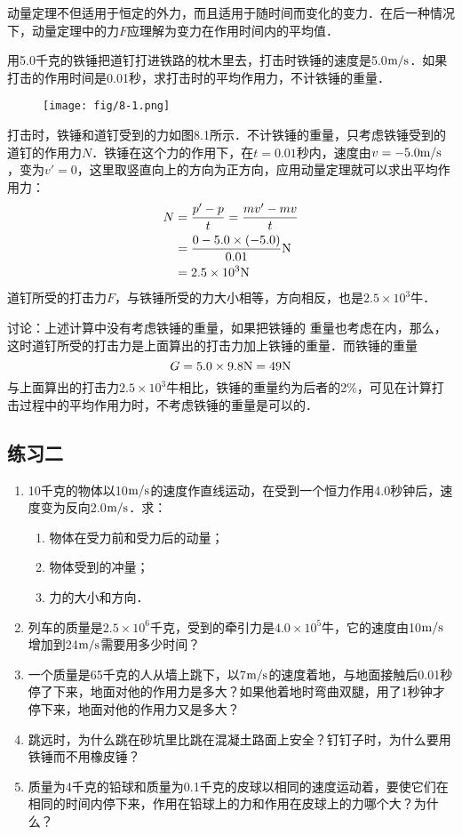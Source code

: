 动量定理不但适用于恒定的外力，而且适用于随时间而变化的变力．在后一种情况下，动量定理中的力$F$应理解为变力在作用时间内的平均值．


\begin{example}
    用5.0千克的铁锤把道钉打进铁路的枕木里去，打击时铁锤的速度是5.0$\text{m}/\text{s}$．如果打击的作用时间是0.01秒，求打击时的平均作用力，不计铁锤的重量．
\end{example}

\begin{figure}[htp]\centering
\texttt{[image: fig/8-1.png]}
\caption{}
\end{figure}

\begin{solution}
    打击时，铁锤和道钉受到的力如图8.1所示．不计铁锤的重量，只考虑铁锤受到的道钉的作用力$N$．铁锤在这个力的作用下，在$t=0.01$秒内，速度由$v=-5.0\text{m}/\text{s}$，变为$v'=0$，这里取竖直向上的方向为正方向，应用动量定理就可以求出平均作用力：
\[\begin{split}
    N&=\frac{p'-p}{t}=\frac{mv'-mv}{t}\\
    &=\frac{0-5.0\times (-5.0)}{0.01}{\rm N}\\
    &=2.5\times 10^3{\rm N}
\end{split}\]
道钉所受的打击力$F$，与铁锤所受的力大小相等，方向相反，也是$2.5\times 10^3$牛．
\end{solution}

讨论：上述计算中没有考虑铁锤的重量，如果把铁锤的
重量也考虑在内，那么，这时道钉所受的打击力是上面算出的打击力加上铁锤的重量．而铁锤的重量
\[G=5.0\times 9.8{\rm N}=49{\rm N} \]
与上面算出的打击力$2.5\times 10^3$牛相比，铁锤的重量约为后者的2\%，可见在计算打击过程中的平均作用力时，不考虑铁锤的重量是可以的．

\subsection*{练习二}
\begin{enumerate}
    \item 10千克的物体以10$\text{m}/\text{s}$的速度作直线运动，在受到一个恒力作用4.0秒钟后，速度变为反向2.0$\text{m}/\text{s}$．求：
     \begin{enumerate}
        \item 物体在受力前和受力后的动量；
        \item 物体受到的冲量；
        \item 力的大小和方向．
    \end{enumerate}
    \item 列车的质量是$2.5\times 10^6$千克，受到的牵引力是$4.0\times 
    10^5$牛，它的速度由10$\text{m}/\text{s}$增加到24$\text{m}/\text{s}$需要用多少时间？
    \item 一个质量是65千克的人从墙上跳下，以7$\text{m}/\text{s}$的速度着地，与地面接触后0.01秒停了下来，地面对他的作用力是多大？如果他着地时弯曲双腿，用了1秒钟才停下来，地面对他的作用力又是多大？
    \item 跳远时，为什么跳在砂坑里比跳在混凝土路面上安全？钉钉子时，为什么要用铁锤而不用橡皮锤？
    \item 质量为4千克的铅球和质量为0.1千克的皮球以相同的速度运动着，要使它们在相同的时间内停下来，作用在铅球上的力和作用在皮球上的力哪个大？为什么？
\end{enumerate}

